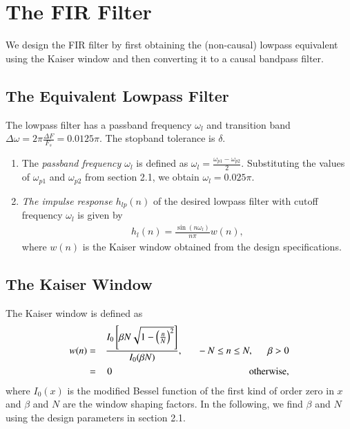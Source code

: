 \documentclass{article}
\begin{document}
\section{The FIR Filter}
We design the FIR filter by first obtaining the (non-causal) lowpass equivalent using the Kaiser window
and then
converting it to a causal bandpass filter.

\subsection{The Equivalent Lowpass Filter}
The lowpass filter has a passband frequency $\omega_l$ and transition band $\Delta \omega = 2\pi \frac{\Delta F}{F_s} = 0.0125\pi$.
The stopband tolerance is $\delta$.
\begin{enumerate}
\item  The {\em passband frequency $\omega_l$}  is defined as $\omega_l = \frac{\omega_{p1} - \omega_{p2}}{2}$.  Substituting the values of $\omega_{p1}$ and $\omega_{p2}$ from section 2.1, we obtain $\omega_l = 0.025\pi$.

\item {\em The impulse response $h_{lp}(n)$} of the desired lowpass filter with cutoff frequency $\omega_l$
is given by
\begin{eqnarray}
\label{firlpdef}
h_l(n) = \frac{\sin(n\omega_l)}{n\pi}w(n),
\end{eqnarray}
where $w(n)$ is the Kaiser window obtained from the design specifications.
\end{enumerate}

\subsection{The Kaiser Window}
The Kaiser window is defined as
\begin{eqnarray}
\label{kaiser}
w(n) &=& \frac{I_0\left[ \beta N \sqrt{1 - \left(\frac{n}{N}\right)^2} \right]}{I_0(\beta N)},
\indent -N \leq n \leq N, \indent \beta > 0 \nonumber \\
&=& 0 \hspace{5cm} \mbox{otherwise,}
\end{eqnarray}
where $I_0(x)$ is the modified Bessel function of the first kind of order zero in $x$ and $\beta$
and $N$ are the window shaping factors.  In the following,
we find $\beta$ and $N$ using the design parameters in section 2.1.
\end{document}
